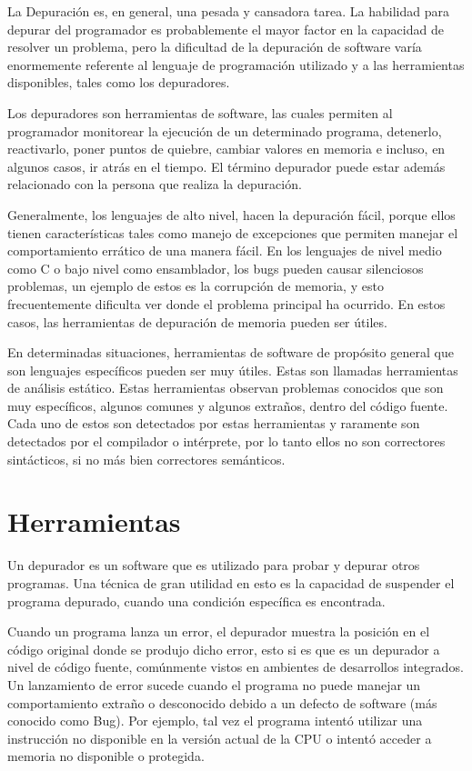 \documentclass[12pt,legalpaper]{report}
\begin{document}
La Depuración es, en general, una pesada y cansadora tarea.  La habilidad para depurar del programador es probablemente el mayor factor en la capacidad de resolver un problema, pero la dificultad de la depuración de software varía enormemente referente al lenguaje de programación utilizado y a las herramientas disponibles, tales como los depuradores.  

Los depuradores son herramientas de software, las cuales permiten al programador monitorear la ejecución de un determinado programa, detenerlo, reactivarlo, poner puntos de quiebre, cambiar valores en memoria e incluso, en algunos casos, ir atrás en el tiempo.  El término depurador puede estar además relacionado con la persona que realiza la depuración.

Generalmente, los lenguajes de alto nivel, hacen la depuración fácil, porque ellos tienen características tales como manejo de excepciones que permiten manejar el comportamiento errático de una manera fácil.  En los lenguajes de nivel medio como C o bajo nivel como ensamblador, los bugs pueden causar silenciosos problemas, un ejemplo de estos es la corrupción de memoria, y esto frecuentemente dificulta ver donde el problema principal ha ocurrido.  En estos casos, las herramientas de depuración de memoria pueden ser útiles.

En determinadas situaciones, herramientas de software de propósito general que son lenguajes específicos pueden ser muy útiles.  Estas son llamadas herramientas de análisis estático.  Estas herramientas observan problemas conocidos que son muy específicos, algunos comunes y algunos extraños, dentro del código fuente.  Cada uno de estos son detectados por estas herramientas y raramente son detectados por el compilador o intérprete, por lo tanto ellos no son correctores sintácticos, si no más bien correctores semánticos.


	\section{Herramientas}

Un depurador es un software que es utilizado para probar y depurar otros programas.  Una técnica de gran utilidad en esto es la capacidad de suspender el programa depurado, cuando una condición específica es encontrada.

Cuando un programa lanza un error, el depurador muestra la posición en el código original donde se produjo dicho error, esto si es que es un depurador a nivel de código fuente, comúnmente vistos en ambientes de desarrollos integrados.  Un lanzamiento de error sucede cuando el programa no puede manejar un comportamiento extraño o desconocido debido a un defecto de software (más conocido como Bug).  Por ejemplo, tal vez el programa intentó utilizar una instrucción no disponible en la versión actual de la CPU o intentó acceder a memoria no disponible o protegida.
\end{document}
